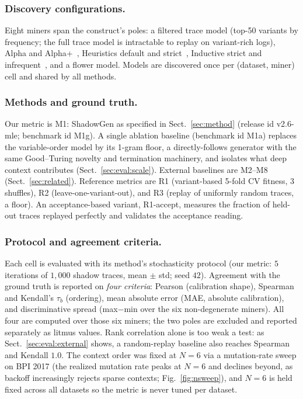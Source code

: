 \documentclass[runningheads]{llncs}
\newcommand{\chg}[1]{\textcolor{chgblue}{#1}}
\begin{document}
\subsubsection{Discovery configurations.}
Eight miners span the construct's poles: a filtered trace model (top-50 variants by frequency; the full trace model is intractable to replay on variant-rich logs), Alpha and Alpha+~\cite{vanderaalst2004alpha}, Heuristics default and strict~\cite{weijters2006hm}, Inductive strict and infrequent~\cite{leemans2013im,leemans2014imf}, and a flower model. Models are discovered once per (dataset, miner) cell and shared by all methods.

\subsubsection{Methods and ground truth.}
\chg{Our metric is M1: ShadowGen as specified in Sect.~\ref{sec:method} (release id v2.6-mle; benchmark id M1g). A single ablation baseline (benchmark id M1a) replaces the variable-order model by its 1-gram floor, a directly-follows generator with the same Good--Turing novelty and termination machinery, and isolates what deep context contributes (Sect.~\ref{sec:eval:scale}).} External baselines are M2--M8 (Sect.~\ref{sec:related}). Reference metrics are R1 (variant-based 5-fold CV fitness, 3 shuffles), R2 (leave-one-variant-out), and R3 (replay of uniformly random traces, a floor). An acceptance-based variant, R1-accept, measures the fraction of held-out traces replayed perfectly and validates the acceptance reading.

\subsubsection{Protocol and agreement criteria.}
Each cell is evaluated with its method's stochasticity protocol (our metric: $5$ iterations of $1{,}000$ shadow traces, mean $\pm$ std; seed $42$). Agreement with the ground truth is reported on \emph{four criteria}: Pearson (calibration shape), Spearman and Kendall's $\tau_b$ (ordering), mean absolute error (MAE, absolute calibration), and discriminative spread (max$-$min over the six non-degenerate miners). All four are computed over those six miners; the two poles are excluded and reported separately as litmus values. Rank correlation alone is too weak a test: as Sect.~\ref{sec:eval:external} shows, a random-replay baseline also reaches Spearman and Kendall $1.0$. The context order was fixed at $N{=}6$ via a mutation-rate sweep on BPI 2017 (the realized mutation rate peaks at $N{=}6$ and declines beyond, as backoff increasingly rejects sparse contexts; Fig.~\ref{fig:nsweep}), and $N{=}6$ is held fixed across all datasets so the metric is never tuned per dataset.
\end{document}
